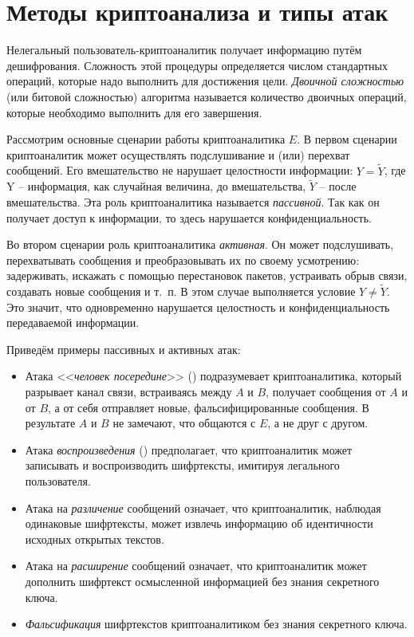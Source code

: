 \section{Методы криптоанализа и типы атак}

Нелегальный пользователь-криптоаналитик получает информацию путём дешифрования. Сложность этой процедуры определяется числом стандартных операций, которые надо выполнить для достижения цели. \emph{Двоичной сложностью} (или битовой сложностью) алгоритма называется количество двоичных операций, которые необходимо выполнить для его завершения.

Рассмотрим основные сценарии работы криптоаналитика $E$. В первом сценарии криптоаналитик может осуществлять подслушивание и (или) перехват сообщений. Его вмешательство не нарушает целостности информации: $Y=\widetilde{Y}$, где Y -- информация, как случайная величина, до вмешательства, $\widetilde{Y}$ -- после вмешательства. Эта роль криптоаналитика называется \emph{пассивной}. Так как он получает доступ к информации, то здесь нарушается конфиденциальность.

Во втором сценарии роль криптоаналитика \emph{активная}. Он может подслушивать, перехватывать сообщения и преобразовывать их по своему усмотрению: задерживать, искажать с помощью перестановок пакетов, устраивать обрыв связи, создавать новые сообщения и т.~п. В этом случае выполняется условие $Y \neq \widetilde{Y}$. Это значит, что одновременно нарушается целостность и конфиденциальность передаваемой информации.

Приведём примеры пассивных и активных атак:
\begin{itemize}
    \item Атака <<\emph{человек посередине}>> () подразумевает криптоаналитика, который разрывает канал связи, встраиваясь между $A$ и $B$, получает сообщения от $A$ и от $B$, а от себя отправляет новые, фальсифицированные сообщения. В результате $A$ и $B$ не замечают, что общаются с $E$, а не друг с другом.
    \item Атака \emph{воспроизведения} () предполагает, что криптоаналитик может записывать и воспроизводить шифртексты, имитируя легального пользователя.
    \item Атака на \emph{различение} сообщений означает, что криптоаналитик, наблюдая одинаковые шифртексты, может извлечь информацию об идентичности исходных открытых текстов.
    \item Атака на \emph{расширение} сообщений означает, что криптоаналитик может дополнить шифртекст осмысленной информацией без знания секретного ключа.
    \item \emph{Фальсификация} шифртекстов криптоаналитиком без знания секретного ключа.
\end{itemize}

